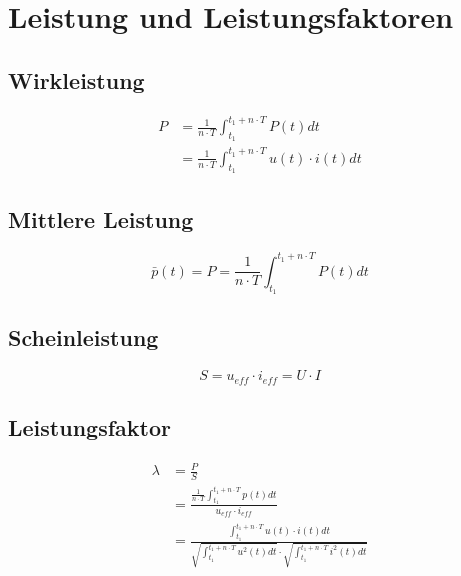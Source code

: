 \section{Leistung und Leistungsfaktoren}
\begin{multicols}{2}{}
 
\subsection*{Wirkleistung}
\begin{align*}
P &= \frac{1}{n \cdot T} \int_{t_{1}}^{t_{1} + n \cdot T} P \left( t \right) dt \\
  &= \frac{1}{n \cdot T} \int_{t_{1}}^{t_{1} + n \cdot T} u \left( t \right) \cdot i \left( t \right) dt
\end{align*}

\subsection*{Mittlere Leistung}
\[\bar{p} \left(t\right) = P = \frac{1}{n \cdot T} \int_{t_{1}}^{t_{1} + n \cdot T} P \left( t \right) dt\]

\subsection*{Scheinleistung}
\[ S = u_{eff} \cdot i_{eff} = U \cdot I\]
\end{multicols}

\subsection*{Leistungsfaktor}
\begin{align*}
\lambda &= \frac{P}{S} \\
	&= \frac{\frac{1}{n \cdot T} \int_{t_{1}}^{t_{1} + n \cdot T} p\left( t \right) dt}
	   { u_{eff} \cdot i_{eff}} \\
	&=  \frac{ \int_{t_{1}}^{t_{1} + n \cdot T} u \left( t \right) \cdot i \left( t \right) dt}
	   {\sqrt{ \int_{t_{1}}^{t_{1} + n \cdot T} u^2 \left( t \right) dt} \cdot
	    \sqrt{ \int_{t_{1}}^{t_{1} + n \cdot T} i^2 \left( t \right) dt}}
\end{align*}

\newpage
